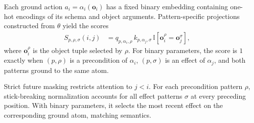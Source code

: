 
Each ground action $a_i=\alpha_i(\mathbf{o}_i)$ has a fixed binary embedding
containing one-hot encodings of its schema and object arguments.
Pattern-specific projections constructed from $\theta$ yield the scores
\begin{align}
S_{p,\rho,\sigma}(i,j)
&=
q_{p,\alpha_i,\rho}\,
k_{p,\alpha_j,\sigma}\,
\mathbb{I}\!\left[
\mathbf{o}_i^\rho=\mathbf{o}_j^\sigma
\right],
\label{eq:scores}
\end{align}
where $\mathbf{o}_i^\rho$ is the object tuple selected by $\rho$.
For binary parameters, the score is $1$ exactly when $(p,\rho)$ is a
precondition of $\alpha_i$, $(p,\sigma)$ is an effect of $\alpha_j$, and both
patterns ground to the same atom.


Strict future masking restricts attention to $j<i$.
For each precondition pattern $\rho$, stick-breaking normalization accounts for all effect patterns $\sigma$ at every preceding position. With binary parameters, it selects the most recent effect on the corresponding
ground atom, matching \strips semantics.

